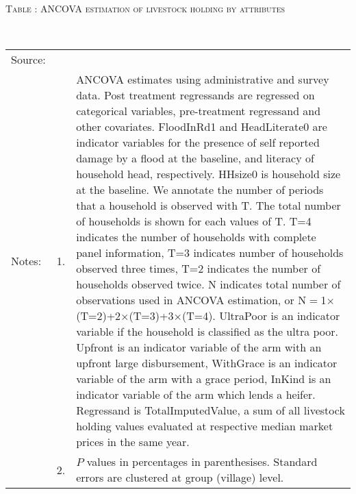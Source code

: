 \hspace{-1cm}\begin{minipage}[t]{14cm}
\hfil\textsc{\normalsize Table \thetable: ANCOVA estimation of livestock holding by attributes\label{tab ANCOVA livestock holding attributes}}\\
\setlength{\tabcolsep}{1pt}
\setlength{\baselineskip}{8pt}
\renewcommand{\arraystretch}{.55}
\hfil{}\\
\renewcommand{\arraystretch}{.8}
\setlength{\tabcolsep}{1pt}
\begin{tabular}{>{\hfill\scriptsize}p{1cm}<{}>{\hfill\scriptsize}p{.25cm}<{}>{\scriptsize}p{12cm}<{\hfill}}
Source:& \multicolumn{2}{l}{\scriptsize Estimated with GUK administrative and survey data.}\\
Notes: & 1. & ANCOVA estimates using administrative and survey data. Post treatment regressands are regressed on categorical variables, pre-treatment regressand and other covariates. \textsf{FloodInRd1} and \textsf{HeadLiterate0} are indicator variables for the presence of self reported damage by a flood at the baseline, and literacy of household head, respectively. \textsf{HHsize0} is household size at the baseline. We annotate the number of periods that a household is observed with \textsf{T}. The total number of households is shown for each values of \textsf{T}. \textsf{T=4} indicates the number of households with complete panel information, \textsf{T=3} indicates number of households observed three times, \textsf{T=2} indicates the number of households observed twice. \textsf{N} indicates total number of observations used in ANCOVA estimation, or \textsf{N$=$1$\times$(T=2)+2$\times$(T=3)+3$\times$(T=4)}.  \textsf{UltraPoor} is an indicator variable if the household is classified as the ultra poor. \textsf{Upfront} is an indicator variable of the arm with an upfront large disbursement, \textsf{WithGrace} is an indicator variable of the arm with a grace period, \textsf{InKind} is an indicator variable of the arm which lends a heifer. Regressand is \textsf{TotalImputedValue}, a sum of all livestock holding values evaluated at respective median market prices in the same year. \\
& 2. & $P$ values in percentages in parenthesises. Standard errors are clustered at group (village) level.
\end{tabular}
\end{minipage}

